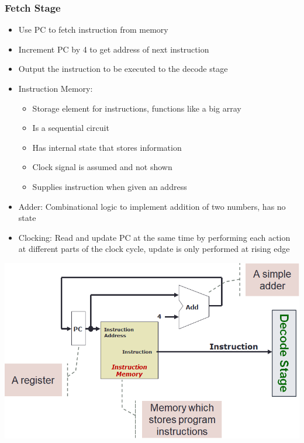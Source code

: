 \documentclass[10pt, portrait]{article}
\begin{document}
\begin{multicols*}{2}
\subsubsection{Fetch Stage}
\begin{itemize}
    \item Use PC to fetch instruction from memory
    \item Increment PC by 4 to get address of next instruction
    \item Output the instruction to be executed to the decode stage
    \item Instruction Memory:
    \begin{itemize}
        \item Storage element for instructions, functions like a big array
        \item Is a sequential circuit
        \item Has internal state that stores information
        \item Clock signal is assumed and not shown
        \item Supplies instruction when given an address
    \end{itemize}
    \item Adder: Combinational logic to implement addition of two numbers, has no state
    \item Clocking: Read and update PC at the same time by performing each action at different parts of the clock cycle, update is only performed at rising edge
\end{itemize}
\begin{center}
    \includegraphics[width=0.7\linewidth]{fetch.png}
\end{center}


\end{multicols*}
\end{document}
